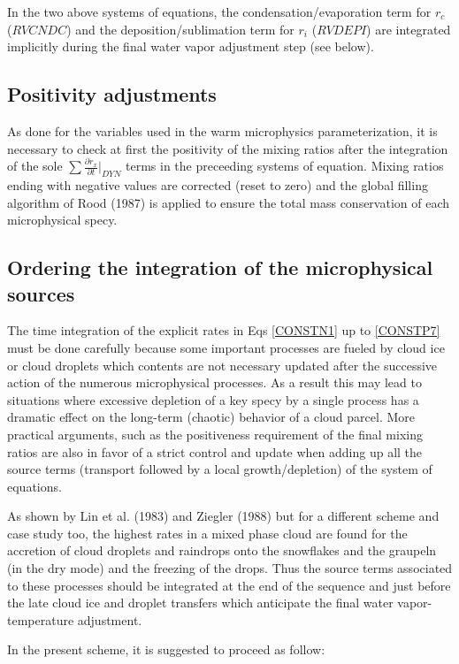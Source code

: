 In the two above systems of equations, the condensation/evaporation term for
$r_c$ ($RVCNDC$) and the deposition/sublimation term for $r_i$ ($RVDEPI$) are
integrated implicitly during the final water vapor adjustment step (see below).

%
\subsection{Positivity adjustments}
%

As done for the variables used in the warm microphysics parameterization, it is
necessary to check at first the positivity of the
mixing ratios after the integration of the sole
$\sum \frac{\displaystyle{\partial r_x}}{\displaystyle{\partial t}} \Big|_{DYN}$
terms in the preceeding systems of equation. Mixing ratios ending with negative
values are corrected (reset to zero) and the global filling algorithm of Rood
(1987) is applied to ensure the total mass conservation of each microphysical
specy.

%
\subsection{Ordering the integration of the microphysical sources}
%
The time integration of the explicit rates in Eqs \ref{CONSTN1} up to
\ref{CONSTP7} must be done carefully
because some important processes are fueled by cloud ice or cloud droplets which
contents are not necessary updated after the successive action of the numerous
microphysical processes. As a result this may lead to situations where excessive
depletion of a key specy by a single process has a dramatic effect on the
long-term (chaotic) behavior of a cloud parcel. More practical arguments, such
as the positiveness requirement of the final mixing ratios are also in favor of
a strict control and update when adding up all the source terms (transport
followed by a local growth/depletion) of the system of equations.

As shown by Lin et al. (1983) and Ziegler (1988) but for a different scheme and
case study too, the highest rates in a mixed phase cloud are found for the
accretion of cloud droplets and raindrops onto the snowflakes and the graupeln
(in the dry mode)
and the freezing of the drops. Thus the source terms associated to these
processes should be integrated at the end of the sequence and just before the
late cloud ice and droplet transfers which anticipate the final water
vapor-temperature adjustment.

In the present scheme, it is suggested to proceed as follow:

